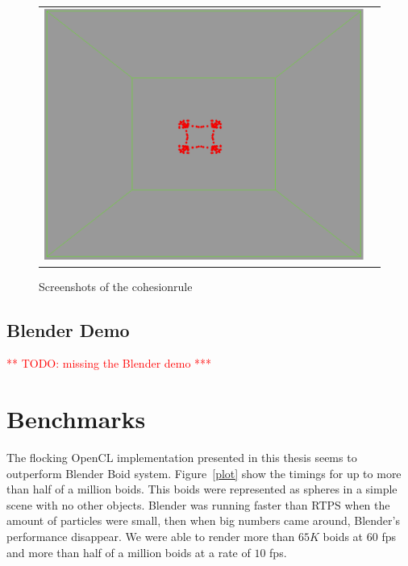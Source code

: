 \begin{figure}[htbp]
\begin{center}
\begin{tabular}{cc}
\includegraphics[scale= 0.15]{figures/coh4.pdf}
\end{tabular}
\end{center}
\caption{Screenshots of the cohesionrule}
\label{cohRule}
\end{figure}

\subsection{Blender Demo}
\textcolor{red}{** TODO: missing the Blender demo ***}

\section{Benchmarks}

The flocking OpenCL implementation presented in this thesis seems to outperform Blender Boid system. Figure~\ref{plot} show the timings for up to more than half of a million boids. This boids were represented as spheres in a simple scene with no other objects. Blender was running faster than RTPS when the amount of particles were small, then when big numbers came around, Blender's performance disappear.  We were able to render more than $65K$ boids at $60$ fps and more than half of a million boids at a rate of $10$ fps.

